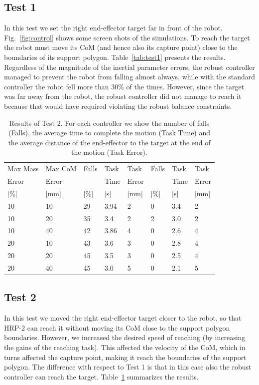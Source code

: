 \subsection{Test 1}
In this test we set the right end-effector target far in front of the robot.
Fig.~\ref{fig:control}  shows some screen shots of the simulations.
To reach the target the robot must move its CoM (and hence also its capture point) close to the boundaries of its support polygon. 
Table~\ref{tab:test1} presents the results. 
Regardless of the magnitude of the inertial parameter errors, the robust controller managed to prevent the robot from falling almost always, while with the  standard controller the robot fell more than 30\% of the times.
However, since the target was far away from the robot, the robust controller did not manage to reach it because that would have required violating the robust balance constraints.
\begin{table}[!h]
\begin{center}
\caption{Results of Test 2. For each controller we show the number of falls (Falls), the average time to complete the motion (Task Time) and the average distance of the end-effector to the target at the end of the motion (Task Error).}
\begin{tabular}{ |l|l|l|l|l|l|l|l| }
\hline Max Mass & Max CoM &{Falls}& Task &{Task} & Falls & Task& Task  \\
Error & Error & & Time   &  Error & &  Time & Error\\ 
{[\%]} & [mm] & [\%]  &  [s]  &  [mm]  & [\%]  &  [s] & [mm]\\ 
\hline
10 & 10 & 29 & 3.94 & 2 & 0 & 3.4 & 2 \\
10 & 20 & 35 & 3.4 & 2 & 2 & 3.0 & 2 \\
10 & 40 & 42 & 3.86 & 4 & 0 & 2.6 & 4 \\
20 & 10 & 43 & 3.6 & 3 & 0 & 2.8 & 4 \\
20 & 20 & 45 & 3.5 & 3 & 0 & 2.5 & 4 \\
20 & 40 & 45 & 3.0 & 5 & 0 & 2.1 & 5 \\

\hline
\end{tabular}
\label{tab:test2}
\end{center}
\end{table}
\subsection{Test 2}
In this test we moved the right end-effector target closer to the robot, so that HRP-2 can reach it without moving its CoM close to the support polygon boundaries.
However, we increased the desired speed of reaching (by increasing the gains of the reaching task).
This affected the velocity of the CoM, which in turns affected the capture point, making it reach the boundaries of the support polygon.
The difference with respect to Test 1 is that in this case also the robust controller can reach the target.
Table~\ref{tab:test2} summarizes the results.

